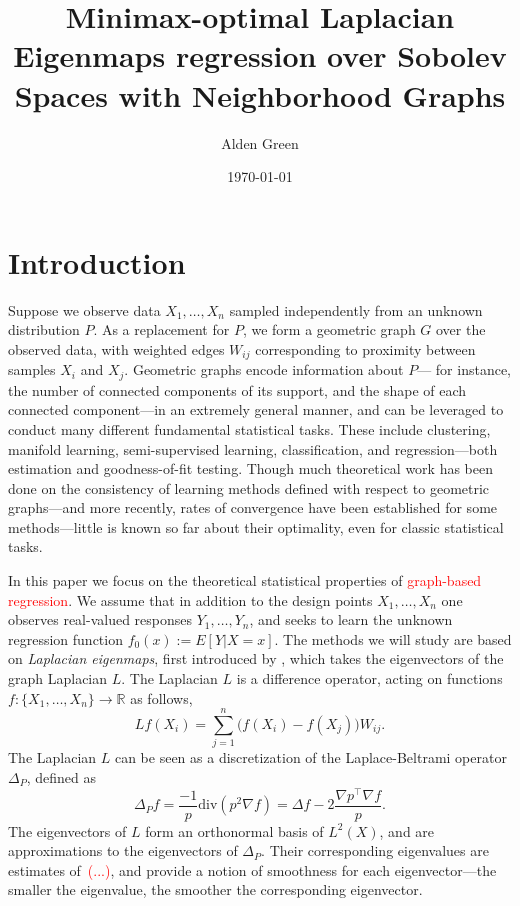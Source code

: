 \documentclass{article}
\newcommand{\Reals}{\mathbb{R}}
\newcommand{\1}{\mathbf{1}}
\theoremstyle{alden}
\theoremstyle{aldenthm}
\theoremstyle{definition}
\theoremstyle{remark}
\begin{document}
\title{Minimax-optimal Laplacian Eigenmaps regression over Sobolev Spaces with Neighborhood Graphs}
\author{Alden Green}
\date{\today}
\maketitle

\section{Introduction}
\label{sec:introduction}

Suppose we observe data $X_1,\ldots,X_n$ sampled independently from an unknown distribution $P$. As a replacement for $P$, we form a geometric graph $G$ over the observed data, with weighted edges $W_{ij}$ corresponding to proximity between samples $X_i$ and $X_j$. Geometric graphs encode information about $P$--- for instance, the number of connected components of its support, and the shape of each connected component---in an extremely general manner, and can be leveraged to conduct many different fundamental statistical tasks. These include clustering, manifold learning, semi-supervised learning, classification, and regression---both estimation and goodness-of-fit testing. Though much theoretical work has been done on the consistency of learning methods defined with respect to geometric graphs---and more recently, rates of convergence have been established for some methods---little is known so far about their optimality, even for classic statistical tasks. 

In this paper we focus on the theoretical statistical properties of \textcolor{red}{graph-based regression}. We assume that in addition to the design points $X_1,\ldots,X_n$ one observes real-valued responses $Y_1,\ldots,Y_n$, and seeks to learn the unknown regression function $f_0(x) := E[Y|X = x]$. The methods we will study are based on \emph{Laplacian eigenmaps}, first introduced by \cite{belkin03a}, which takes the eigenvectors of the graph Laplacian $L$. The Laplacian $L$ is a difference operator, acting on functions $f: \{X_1,\ldots,X_n\} \to \Reals$ as follows,
\begin{equation}
\label{eqn:graph_laplacian}
Lf(X_i) = \sum_{j = 1}^{n} \bigl(f(X_i) - f(X_j)\bigr)W_{ij}. 
\end{equation}
The Laplacian $L$ can be seen as a discretization of the Laplace-Beltrami operator $\Delta_P$, defined as
\begin{equation}
\label{eqn:fokker_planck_1}
\Delta_Pf= \frac{-1}{p} \mathrm{div}(p^2 \nabla f) = \Delta f - 2\frac{\nabla p^{\top} \nabla f}{p}.
\end{equation}
The eigenvectors of $L$ form an orthonormal basis of $L^2(X)$, and are approximations to the eigenvectors of $\Delta_P$. Their corresponding eigenvalues are estimates of~\textcolor{red}{(...)}, and provide a notion of smoothness for each eigenvector---the smaller the eigenvalue, the smoother the corresponding eigenvector. 
\end{document}
